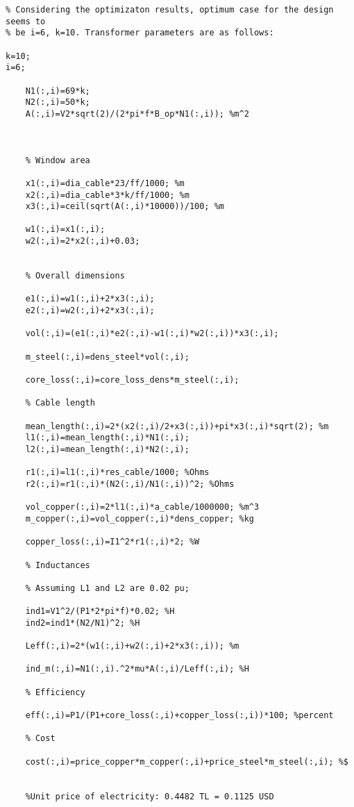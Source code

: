 \begin{verbatim}
% Considering the optimizaton results, optimum case for the design seems to
% be i=6, k=10. Transformer parameters are as follows:

k=10;
i=6;

    N1(:,i)=69*k;
    N2(:,i)=50*k;
    A(:,i)=V2*sqrt(2)/(2*pi*f*B_op*N1(:,i)); %m^2



    % Window area

    x1(:,i)=dia_cable*23/ff/1000; %m
    x2(:,i)=dia_cable*3*k/ff/1000; %m
    x3(:,i)=ceil(sqrt(A(:,i)*10000))/100; %m

    w1(:,i)=x1(:,i);
    w2(:,i)=2*x2(:,i)+0.03;


    % Overall dimensions

    e1(:,i)=w1(:,i)+2*x3(:,i);
    e2(:,i)=w2(:,i)+2*x3(:,i);

    vol(:,i)=(e1(:,i)*e2(:,i)-w1(:,i)*w2(:,i))*x3(:,i);

    m_steel(:,i)=dens_steel*vol(:,i);

    core_loss(:,i)=core_loss_dens*m_steel(:,i);

    % Cable length

    mean_length(:,i)=2*(x2(:,i)/2+x3(:,i))+pi*x3(:,i)*sqrt(2); %m
    l1(:,i)=mean_length(:,i)*N1(:,i);
    l2(:,i)=mean_length(:,i)*N2(:,i);

    r1(:,i)=l1(:,i)*res_cable/1000; %Ohms
    r2(:,i)=r1(:,i)*(N2(:,i)/N1(:,i))^2; %Ohms

    vol_copper(:,i)=2*l1(:,i)*a_cable/1000000; %m^3
    m_copper(:,i)=vol_copper(:,i)*dens_copper; %kg

    copper_loss(:,i)=I1^2*r1(:,i)*2; %W

    % Inductances

    % Assuming L1 and L2 are 0.02 pu;

    ind1=V1^2/(P1*2*pi*f)*0.02; %H
    ind2=ind1*(N2/N1)^2; %H

    Leff(:,i)=2*(w1(:,i)+w2(:,i)+2*x3(:,i)); %m

    ind_m(:,i)=N1(:,i).^2*mu*A(:,i)/Leff(:,i); %H

    % Efficiency

    eff(:,i)=P1/(P1+core_loss(:,i)+copper_loss(:,i))*100; %percent

    % Cost

    cost(:,i)=price_copper*m_copper(:,i)+price_steel*m_steel(:,i); %$


    %Unit price of electricity: 0.4482 TL = 0.1125 USD


\end{verbatim}
